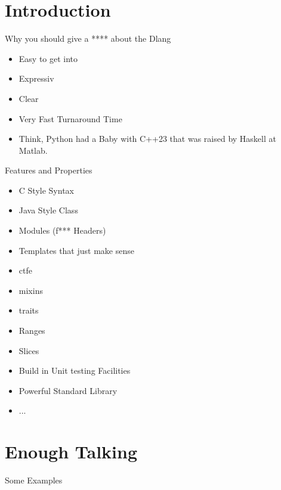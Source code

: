 \documentclass[xelatex,12pt]{beamer}
\begin{document}
\section{Introduction}
\begin{frame}{Why you should give a **** about the Dlang}
	\begin{itemize}
		\item Easy to get into
		\item Expressiv 
		\item Clear
		\item Very Fast Turnaround Time
		\item Think, Python had a Baby with C++23 that was raised by Haskell at
			Matlab.
	\end{itemize}
\end{frame}
\begin{frame}{Features and Properties}
	\begin{itemize}
		\item C Style Syntax
		\item Java Style Class
		\item Modules (f*** Headers)
		\item Templates that just make sense
		\item \gls{ctfe}
		\item mixins
		\item traits
		\item Ranges
		\item Slices
		\item Build in Unit testing Facilities
		\item Powerful Standard Library
		\item ...
	\end{itemize}
\end{frame}

\section{Enough Talking}
\begin{frame}{Some Examples}
	
\end{frame}
\end{document}

